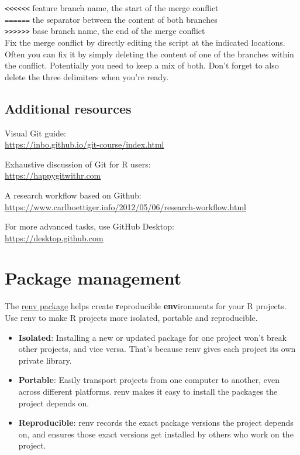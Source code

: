 \documentclass[
  letterpaper,
  DIV=11,
  numbers=noendperiod]{scrreport}
\begin{document}
\texttt{\textless{}\textless{}\textless{}\textless{}\textless{}\textless{}}
feature branch name, the start of the merge conflict\\
\texttt{======} the separator between the content of both branches\\
\texttt{\textgreater{}\textgreater{}\textgreater{}\textgreater{}\textgreater{}\textgreater{}}
base branch name, the end of the merge conflict\\

Fix the merge conflict by directly editing the script at the indicated
locations. Often you can fix it by simply deleting the content of one of
the branches within the conflict. Potentially you need to keep a mix of
both. Don't forget to also delete the three delimiters when you're
ready.

\section{Additional resources}\label{additional-resources-1}

Visual Git guide:\\
\url{https://inbo.github.io/git-course/index.html}

Exhaustive discussion of Git for R users:\\
\url{https://happygitwithr.com}

A research workflow based on Github:\\
\url{https://www.carlboettiger.info/2012/05/06/research-workflow.html}

For more advanced tasks, use GitHub Desktop:\\
\url{https://desktop.github.com}


\chapter{Package management}\label{sec-renv}

The \href{https://rstudio.github.io/renv/articles/renv.html}{renv
package} helps create \textbf{r}eproducible \textbf{env}ironments for
your R projects. Use renv to make R projects more isolated, portable and
reproducible.

\begin{itemize}
\item
  \textbf{Isolated}: Installing a new or updated package for one project
  won't break other projects, and vice versa. That's because renv gives
  each project its own private library.
\item
  \textbf{Portable}: Easily transport projects from one computer to
  another, even across different platforms. renv makes it easy to
  install the packages the project depends on.
\item
  \textbf{Reproducible}: renv records the exact package versions the
  project depends on, and ensures those exact versions get installed by
  others who work on the project.
\end{itemize}
\end{document}
